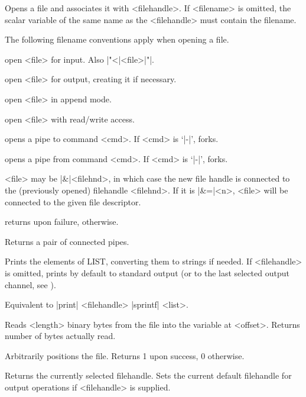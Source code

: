 \documentclass{refbase}
\begin{document}
\begin{enum}{1cm}
Opens a file and associates it with <filehandle>. If <filename> is
omitted, the scalar variable of the same name as the <filehandle> must
contain the filename.

The following filename conventions apply when opening a file.

\begin{enum}{2cm}
 open <file> for input. Also |"<|<file>|"|.

 open <file> for output, creating it if necessary.

 open <file> in append mode.

 open <file> with read/write access.

 opens a pipe to command <cmd>. If <cmd> is `|-|', forks.

 opens a pipe from command <cmd>. If <cmd> is `|-|', forks.
\end{enum}

<file> may be |&|<filehnd>, in which case the new file handle is
connected to the (previously opened) filehandle <filehnd>.
If it is |&=|<n>, <file> will be connected to the given file descriptor.

returns  upon failure, \true{} otherwise.

Returns a pair of connected pipes.

Prints the elements of LIST, converting them to strings if needed. If
<filehandle> is omitted, prints by default to standard output (or to
the last selected output channel, see ).

\Xi{\kwd{printf} [ <filehandle> ] <list> ]}
Equivalent to |print| <filehandle> |sprintf| <list>.

Reads <length> binary bytes from the file into the variable at
<offset>. Returns number of bytes actually read. 

Arbitrarily positions the file. Returns 1 upon success, 0 otherwise.

Returns the currently selected filehandle. 
Sets the current default filehandle for output operations if
<filehandle> is supplied.


\end{enum}
\end{document}
